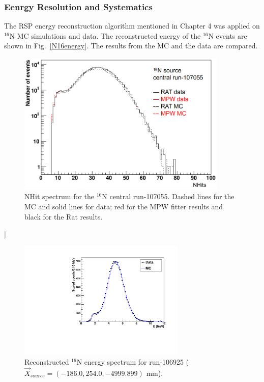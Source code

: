\subsubsection{Eenrgy Resolution and Systematics}
The RSP energy reconstruction algorithm mentioned in Chapter 4 was applied on $^{16}$N MC simulations and data. 
The reconstructed energy of the $^{16}$N events are shown in Fig.~\ref{N16energy}. The results from the MC and the data are compared.
\begin{figure}[htbp]
	\centering
	\includegraphics[width=10cm]{N16_nhits_107055.png}
	\caption{NHit spectrum for the $^{16}$N central run-107055. Dashed lines for the MC and solid lines for data; red for the MPW fitter results and black for the Rat results.}
	\label{N16nhits}
\end{figure}]

\begin{figure}[htbp]
	\centering
	\includegraphics[width=8cm]{N16energyMPWcompare_106925.pdf}
	\caption{Reconstructed $^{16}$N energy spectrum for run-106925 ($\vec{X}_{source}=(-186.0,254.0,-4999.899)$ mm).}
	\label{N16_106925}
\end{figure}


